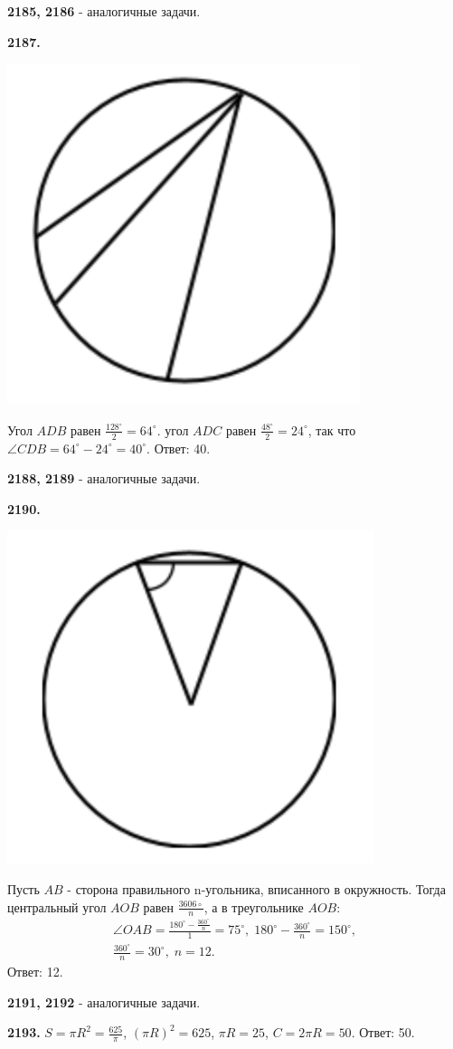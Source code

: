 \textbf{2185, 2186} - аналогичные задачи.

\textbf{2187.}

{\centering \includegraphics[width=0.35\linewidth]{Geometry/Content/49.png}
	
}

 Угол $ADB$ равен $\frac{128^\circ}{2}=64^\circ$. угол $ADC$ равен $\frac{48^\circ}{2}=24^\circ$, так что $\angle CDB = 64^\circ - 24^\circ=40^\circ.$ \newline \null \hspace*{\fill} Ответ: 40.

\textbf{2188, 2189} - аналогичные задачи.

\textbf{2190.}

{\centering \includegraphics[width=0.35\linewidth]{Geometry/Content/50.png}
	
}

Пусть $AB$ - сторона правильного n-угольника, вписанного в окружность. Тогда центральный угол $AOB$ равен $\frac{3606\circ}{n}$, а в треугольнике $AOB$:
\begin{gather*}
	\angle OAB = \frac{180^\circ-\frac{360^\circ}{n}}{1}=75^\circ, \; 180^\circ-\frac{360^\circ}{n}=150^\circ, \\ \frac{360^\circ}{n}=30^\circ,\;  n =12.
\end{gather*} \null \hspace*{\fill} Ответ: 12.

\textbf{2191, 2192} - аналогичные задачи.

\textbf{2193.} $S=\pi R^2= \frac{625}{\pi}$, $(\pi R)^2 = 625$, $\pi R = 25$, $C = 2\pi R = 50.$ \newline \null \hspace*{\fill} Ответ: 50.

